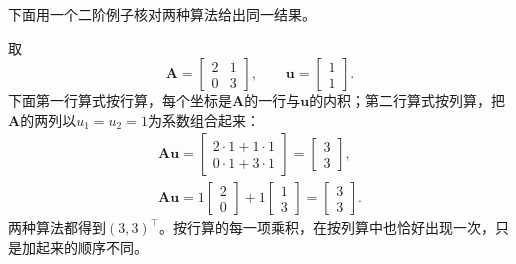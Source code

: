 下面用一个二阶例子核对两种算法给出同一结果。
\begin{example}[按行与按列计算矩阵与向量的乘积]
\label{ex:ls-matrix-vector-rows-columns}
取
\[
\bm A=\begin{bmatrix}2&1\\0&3\end{bmatrix},\qquad
\bm u=\begin{bmatrix}1\\1\end{bmatrix}.
\]
下面第一行算式按行算，每个坐标是$\bm A$的一行与$\bm u$的内积；第二行算式按列算，把$\bm A$的两列以$u_1=u_2=1$为系数组合起来：
\[
\begin{gathered}
\bm A\bm u
 =\begin{bmatrix}2\cdot1+1\cdot1\\0\cdot1+3\cdot1\end{bmatrix}
 =\begin{bmatrix}3\\3\end{bmatrix},\\
\bm A\bm u=1\begin{bmatrix}2\\0\end{bmatrix}+1\begin{bmatrix}1\\3\end{bmatrix}
 =\begin{bmatrix}3\\3\end{bmatrix}.
\end{gathered}
\]
两种算法都得到$(3,3)^\top$。按行算的每一项乘积，在按列算中也恰好出现一次，只是加起来的顺序不同。
\end{example}

